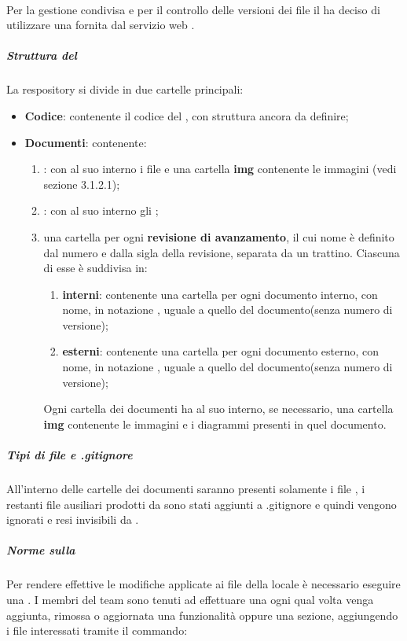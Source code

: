 	\paragraph{}
	Per la gestione condivisa e per il controllo delle versioni dei file il  ha deciso di utilizzare una  fornita dal servizio web .
		\subparagraph{Struttura del }
		La respository si divide in due cartelle principali:
		\begin{itemize}
			\item \textbf{Codice}: contenente il codice del , con struttura ancora da definire;
			\item \textbf{Documenti}: contenente:
			\begin{enumerate}
				\item \textbf{}: con al suo interno i file  e una cartella \textbf{img} contenente le immagini (vedi sezione 3.1.2.1);
				\item \textbf{}: con al suo interno gli ;
				\item una cartella per ogni \textbf{revisione di avanzamento}, il cui nome è definito dal numero e dalla sigla della revisione, separata da un trattino. Ciascuna di esse è suddivisa in:
				\begin{enumerate}
					\item \textbf{interni}: contenente una cartella per ogni documento interno, con nome, in notazione , uguale a quello del documento(senza numero di versione);
					\item \textbf{esterni}: contenente una cartella per ogni documento esterno, con nome, in notazione , uguale a quello del documento(senza numero di versione);
				\end{enumerate}
				Ogni cartella dei documenti ha al suo interno, se necessario, una cartella \textbf{img} contenente le immagini e i diagrammi presenti in quel documento.
			\end{enumerate}
		\end{itemize}
		\subparagraph{Tipi di file e .gitignore}
		All'interno delle cartelle dei documenti saranno presenti solamente i file , i restanti file ausiliari prodotti da \gl{\LaTeX} sono stati aggiunti a .gitignore e quindi vengono ignorati e resi invisibili da .
		\subparagraph{Norme sulla }
		Per rendere effettive le modifiche applicate ai file della  locale è necessario eseguire una \textbf{}.
		I membri del team sono tenuti ad effettuare una  ogni qual volta venga aggiunta, rimossa o aggiornata una funzionalità oppure una sezione, aggiungendo i file interessati tramite il commando:
